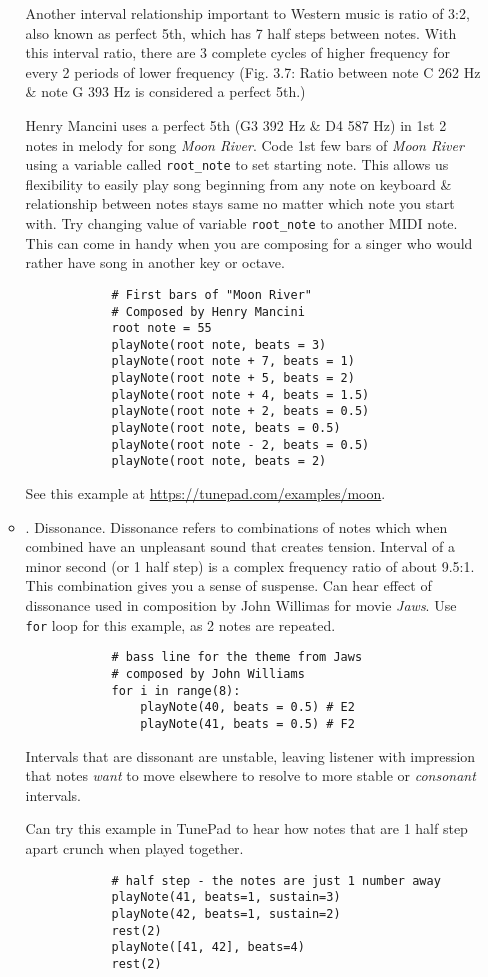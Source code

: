 \documentclass{article}
\begin{document}
\begin{itemize}
\begin{itemize}
		Another interval relationship important to Western music is ratio of 3:2, also known as perfect 5th, which has 7 half steps between notes. With this interval ratio, there are 3 complete cycles of higher frequency for every 2 periods of lower frequency ({\sf Fig. 3.7: Ratio between note C 262 Hz \& note G 393 Hz is considered a perfect 5th.})
		
		{\sc Henry Mancini} uses a perfect 5th (G3 392 Hz \& D4 587 Hz) in 1st 2 notes in melody for song {\it Moon River}. Code 1st few bars of {\it Moon River} using a variable called \verb|root_note| to set starting note. This allows us flexibility to easily play song beginning from any note on keyboard \& relationship between notes stays same no matter which note you start with. Try changing value of variable \verb|root_note| to another MIDI note. This can come in handy when you are composing for a singer who would rather have song in another key or octave.
		\begin{verbatim}
			# First bars of "Moon River"
			# Composed by Henry Mancini
			root note = 55
			playNote(root note, beats = 3)
			playNote(root note + 7, beats = 1)
			playNote(root note + 5, beats = 2)
			playNote(root note + 4, beats = 1.5)
			playNote(root note + 2, beats = 0.5)
			playNote(root note, beats = 0.5)
			playNote(root note - 2, beats = 0.5)
			playNote(root note, beats = 2)
		\end{verbatim}
		See this example at \url{https://tunepad.com/examples/moon}.
		\item {. Dissonance.} Dissonance refers to combinations of notes which when combined have an unpleasant sound that creates tension. Interval of a minor second (or 1 half step) is a complex frequency ratio of about 9.5:1. This combination gives you a sense of suspense. Can hear effect of dissonance used in composition by {\sc John Willimas} for movie {\it Jaws}. Use {\tt for} loop for this example, as 2 notes are repeated.
		\begin{verbatim}
			# bass line for the theme from Jaws
			# composed by John Williams
			for i in range(8):
			    playNote(40, beats = 0.5) # E2
			    playNote(41, beats = 0.5) # F2
		\end{verbatim}
		Intervals that are dissonant are unstable, leaving listener with impression that notes {\it want} to move elsewhere to resolve to more stable or {\it consonant} intervals.
		
		Can try this example in TunePad to hear how notes that are 1 half step apart crunch when played together.
		\begin{verbatim}
			# half step - the notes are just 1 number away
			playNote(41, beats=1, sustain=3)
			playNote(42, beats=1, sustain=2)
			rest(2)
			playNote([41, 42], beats=4)
			rest(2)
			

\end{verbatim}
\end{itemize}
\end{itemize}
\end{document}
